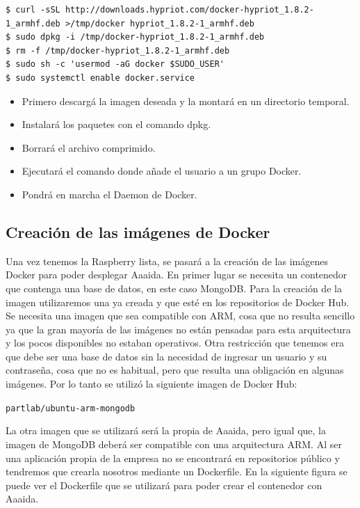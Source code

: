 \begin{lstlisting}[style=Bash]
$ curl -sSL http://downloads.hypriot.com/docker-hypriot_1.8.2-1_armhf.deb >/tmp/docker hypriot_1.8.2-1_armhf.deb
$ sudo dpkg -i /tmp/docker-hypriot_1.8.2-1_armhf.deb
$ rm -f /tmp/docker-hypriot_1.8.2-1_armhf.deb
$ sudo sh -c 'usermod -aG docker $SUDO_USER'
$ sudo systemctl enable docker.service
\end{lstlisting}

\begin{itemize}
\item Primero descargá la imagen deseada y la montará en un directorio temporal.
\item Instalará los paquetes con el comando dpkg.
\item Borrará el archivo comprimido.
\item Ejecutará el comando donde añade el usuario a un grupo Docker. 
\item Pondrá en marcha el Daemon de Docker.  
\end{itemize}


\subsection{Creación de las imágenes de Docker}

Una vez tenemos la Raspberry lista, se pasará a la creación de las imágenes Docker para poder desplegar Aaaida.
En primer lugar se necesita un contenedor que contenga una base de datos, en este caso MongoDB. Para la creación de la imagen utilizaremos una ya creada y que esté en los repositorios de Docker Hub. Se necesita una imagen que sea compatible con ARM, cosa que no resulta sencillo ya que la gran mayoría de las imágenes no están pensadas para esta arquitectura y los pocos disponibles no estaban operativos. Otra restricción que tenemos era que debe ser una base de datos sin la necesidad de ingresar un usuario y su contraseña, cosa que no es habitual, pero que resulta una obligación en algunas imágenes.
Por lo tanto se utilizó la siguiente imagen de Docker Hub:

\begin{center}
\texttt{partlab/ubuntu-arm-mongodb}
\end{center}

La otra imagen que se utilizará será la propia de Aaaida, pero igual que, la imagen de MongoDB deberá ser compatible con una arquitectura ARM. Al ser una aplicación propia de la empresa no se encontrará en repositorios público y tendremos que crearla nosotros mediante un Dockerfile. 
En la siguiente figura se puede ver el Dockerfile que se utilizará para poder crear el contenedor con Aaaida.

